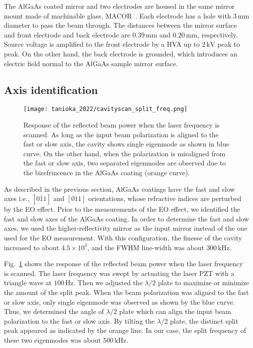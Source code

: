 The AlGaAs coated mirror and two electrodes are housed in the same mirror mount made of machinable glass, MACOR~\cite{macor}.
Each electrode has a hole with $3\, \mathrm{mm}$ diameter to pass the beam through.
The distances between the mirror surface and front electrode and back electrode are $0.39\, \mathrm{mm}$ and $0.20\, \mathrm{mm}$, respectively.
Source voltage is amplified to the front electrode by a HVA up to $2\, \mathrm{kV}$ peak to peak.
On the other hand, the back electrode is grounded, which introduces an electric field normal to the AlGaAs sample mirror surface.

\subsection{Axis identification}

\begin{figure}[htbp]
    \centering
\texttt{[image: tanioka\_2022/cavityscan\_split\_freq.png]}
\caption{
Response of the reflected beam power when the laser frequency is scanned.
As long as the input beam polarization is aligned to the fast or slow axis, the cavity shows single eigenmode as shown in blue curve.
On the other hand, when the polarization is misaligned from the fast or slow axis, two separated eigenmodes are observed due to the birefrincence in the AlGaAs coating (orange curve).
}
\label{fig.split}
\end{figure}

As described in the previous section, AlGaAs coatings have the fast and slow axes i.e., $[0\bar{1}1]$ and $[011]$ orientations, whose refractive indices are perturbed by the EO effect.
Prior to the measurements of the EO effect, we identified the fast and slow axes of the AlGaAs coating.
In order to determine the fast and slow axes, we used the higher-reflectivity mirror as the input mirror instead of the one used for the EO measurement.
With this configuration, the finesse of the cavity increased to about $4.5\times10^3$, and the FWHM line-width was about $300\, \mathrm{kHz}$.

Fig.~\ref{fig.split} shows the response of the reflected beam power when the laser frequency is scanned.
The laser frequency was swept by actuating the laser PZT with a triangle wave at $100\, \mathrm{Hz}$.
Then we adjusted the $\lambda/2$ plate to maximize or minimize the amount of the split peak.
When the beam polarization was aligned to the fast or slow axis, only single eigenmode was observed as shown by the blue curve.
Thus, we determined the angle of $\lambda/2$ plate which can align the input beam polarization to the fast or slow axis.
By tilting the $\lambda/2$ plate, the distinct split peak appeared as indicated by the orange line.
In our case, the split frequency of these two eigenmodes was about $500\, \mathrm{kHz}$.

